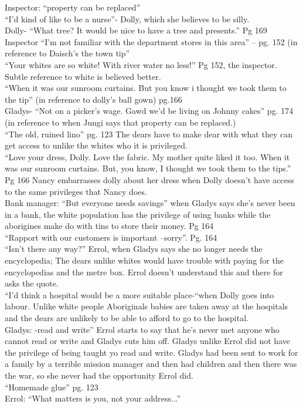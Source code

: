 \documentclass[a4paper]{article}
\begin{document}
Inspector: “property can be replaced” \\
“I'd kind of like to be a nurse”- Dolly, which she believes to be silly. \\
Dolly- “What tree? It would be nice to have a tree and presents.” Pg 169 \\
Inspector “I’m not familiar with the department stores in this area” – pg. 152 (in reference to Daisch’s the town tip” \\
“Your whites are so white! With river water no less!” Pg 152, the inspector. Subtle reference to white is believed better. \\
“When it was our sunroom curtains. But you know i thought we took them to the tip” (in reference to dolly’s ball gown) pg.166 \\
Gladys- “Not on a picker’s wage. Gawd we’d be living on Johnny cakes” pg. 174 (in reference to when Jungi says that property can be replaced.) \\
“The old, ruined lino” pg. 123 The dears have to make dear with what they can get access to unlike the whites who it is privileged. \\
“Love your dress, Dolly. Love the fabric. My mother quite liked it too. When it was our sunroom curtains. But, you know, I thought we took them to the tips.” Pg 166 Nancy embarrasses dolly about her dress when Dolly doesn’t have access to the same privileges that Nancy does. \\
Bank manager: “But everyone needs savings” when Gladys says she’s never been in a bank, the white population has the privilege of using banks while the aborigines make do with tins to store their money. Pg 164 \\
“Rapport with our customers is important –sorry”. Pg. 164 \\
“Isn’t there any way?” Errol, when Gladys says she no longer needs the encyclopedia; The dears unlike whites would have trouble with paying for the encyclopedias and the metre box. Errol doesn’t understand this and there for asks the quote. \\
“I’d think a hospital would be a more suitable place-“when Dolly goes into labour. Unlike white people Aboriginals babies are taken away at the hospitals and the dears are unlikely to be able to afford to go to the hospital. \\
Gladys: -read and write” Errol starts to say that he’s never met anyone who cannot read or write and Gladys cuts him off. Gladys unlike Errol did not have the privilege of being taught yo read and write. Gladys had been sent to work for a family by a terrible mission manager and then had children and then there was the war, so she never had the opportunity Errol did. \\
“Homemade glue” pg. 123 \\
Errol: “What matters is you, not your address...” \\
\end{document}
